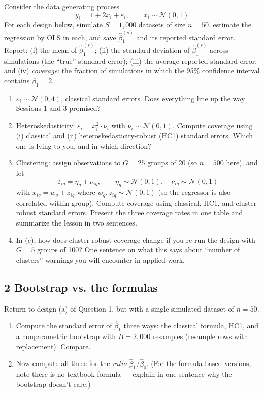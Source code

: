 \documentclass[11pt]{article}
\begin{document}
Consider the data generating process
\[
y_{i} = 1 + 2 x_{i} + \varepsilon_{i}, \qquad x_{i} \sim \mathcal{N}\left(0,1\right)
\]
For each design below, simulate $S = 1{,}000$ datasets of size $n = 50$, estimate the
regression by OLS in each, and save $\hat{\beta}_{1}^{(s)}$ and its reported standard
error. Report: (i) the mean of $\hat{\beta}_{1}^{(s)}$; (ii) the standard deviation of
$\hat{\beta}_{1}^{(s)}$ across simulations (the ``true'' standard error); (iii) the
average reported standard error; and (iv) \emph{coverage}: the fraction of simulations
in which the 95\% confidence interval contains $\beta_{1} = 2$.
\begin{enumerate}[label=(\alph*)]
\item $\varepsilon_{i} \sim \mathcal{N}\left(0, 4\right)$, classical standard errors.
Does everything line up the way Sessions 1 and 3 promised?
\item Heteroskedasticity: $\varepsilon_{i} = x_{i}^{2} \cdot \nu_{i}$ with
$\nu_{i} \sim \mathcal{N}\left(0,1\right)$. Compute coverage using (i) classical and
(ii) heteroskedasticity-robust (HC1) standard errors. Which one is lying to you, and
in which direction?
\item Clustering: assign observations to $G = 25$ groups of 20 (so $n = 500$ here), and let
\[
\varepsilon_{ig} = \eta_{g} + \nu_{ig}, \qquad \eta_{g} \sim \mathcal{N}\left(0,1\right),
\quad \nu_{ig} \sim \mathcal{N}\left(0,1\right)
\]
with $x_{ig} = w_{g} + z_{ig}$ where $w_{g}, z_{ig} \sim \mathcal{N}(0,1)$ (so the
regressor is also correlated within group). Compute coverage using classical, HC1,
and cluster-robust standard errors. Present the three coverage rates in one table and
summarize the lesson in two sentences.
\item In (c), how does cluster-robust coverage change if you re-run the design with
$G = 5$ groups of 100? One sentence on what this says about ``number of clusters''
warnings you will encounter in applied work.
\end{enumerate}

\subsection*{2 Bootstrap vs. the formulas}

Return to design (a) of Question 1, but with a single simulated dataset of $n = 50$.
\begin{enumerate}[label=(\alph*)]
\item Compute the standard error of $\hat{\beta}_{1}$ three ways: the classical formula,
HC1, and a nonparametric bootstrap with $B = 2{,}000$ resamples (resample rows with
replacement). Compare.
\item Now compute all three for the \emph{ratio} $\hat{\beta}_{1} / \hat{\beta}_{0}$.
(For the formula-based versions, note there is no textbook formula --- explain in one
sentence why the bootstrap doesn't care.)
\end{enumerate}
\end{document}
